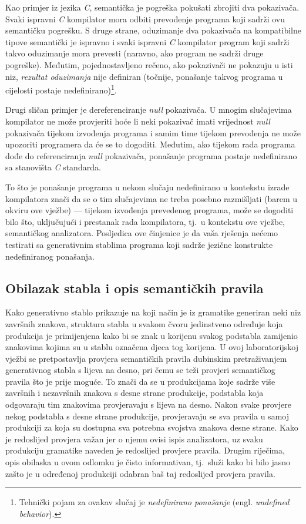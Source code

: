 \documentclass[times, 12pt, utf8]{book}
\begin{document}
Kao primjer iz jezika \emph{C}, semantička je pogreška pokušati zbrojiti dva pokazivača.
Svaki ispravni \emph{C} kompilator mora odbiti prevođenje programa koji sadrži ovu semantičku pogrešku.
S druge strane, oduzimanje dva pokazivača na kompatibilne tipove semantički je ispravno i svaki ispravni \emph{C} kompilator program koji sadrži takvo oduzimanje mora prevesti (naravno, ako program ne sadrži druge pogreške).
Međutim, pojednostavljeno rečeno, ako pokazivači ne pokazuju u isti niz, \emph{rezultat oduzimanja} nije definiran (točnije, ponašanje takvog programa u cijelosti postaje nedefinirano)\footnote{Tehnički pojam za ovakav slučaj je \emph{nedefinirano ponašanje} (engl. \emph{undefined behavior}).}.

Drugi sličan primjer je dereferenciranje \emph{null} pokazivača.
U mnogim slučajevima kompilator ne može provjeriti hoće li neki pokazivač imati vrijednost \emph{null} pokazivača tijekom izvođenja programa i samim time tijekom prevođenja ne može upozoriti programera da će se to dogoditi.
Međutim, ako tijekom rada programa dođe do referenciranja \emph{null} pokazivača, ponašanje programa postaje nedefinirano sa stanovišta \emph{C} standarda.

To što je ponašanje programa u nekom slučaju nedefinirano u kontekstu izrade kompilatora znači da se o tim slučajevima ne treba posebno razmišljati (barem u okviru ove vježbe) --- tijekom izvođenja prevedenog programa, može se dogoditi bilo što, uključujući i prestanak rada kompilatora, tj.~u kontekstu ove vježbe, semantičkog analizatora.
Posljedica ove činjenice je da vaša rješenja nećemo testirati sa generativnim stablima programa koji sadrže jezične konstrukte nedefiniranog ponašanja.

\subsection{Obilazak stabla i opis semantičkih pravila}\label{sec:obilazak}
Kako generativno stablo prikazuje na koji način je iz gramatike generiran neki niz završnih znakova, struktura stabla u svakom čvoru jedinstveno određuje koja produkcija je primijenjena kako bi se znak u korijenu svakog podstabla zamijenio znakovima kojima su u stablu označena djeca tog korijena.
U ovoj laboratorijskoj vježbi se pretpostavlja provjera semantičkih pravila dubinskim pretraživanjem generativnog stabla s lijeva na desno, pri čemu se teži provjeri semantičkog pravila što je prije moguće.
To znači da se u produkcijama koje sadrže više završnih i nezavršnih znakova s desne strane produkcije, podstabla koja odgovaraju tim znakovima provjeravaju s lijeva na desno.
Nakon svake provjere nekog podstabla s desne strane produkcije, provjeravaju se sva pravila u samoj produkciji za koja su dostupna sva potrebna svojstva znakova desne strane.
Kako je redoslijed provjera važan jer o njemu ovisi ispis analizatora, uz svaku produkciju gramatike naveden je redoslijed provjere pravila.
Drugim riječima, opis obilaska u ovom odlomku je čisto informativan, tj.~služi kako bi bilo jasno zašto je u određenoj produkciji odabran baš taj redoslijed provjera pravila.
\end{document}
